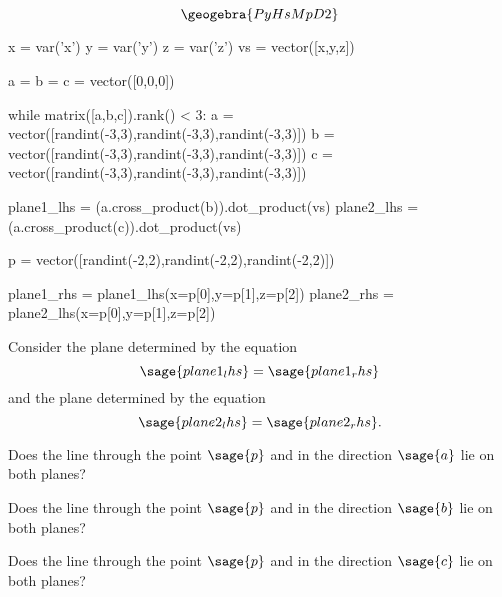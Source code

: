 \documentclass{ximera}
\author{Jim Fowler}
\begin{document}
\[
\geogebra{PyHsMpD2}
\]

\makerandom
\begin{sagesilent}
  x = var('x')
  y = var('y')
  z = var('z')
  vs = vector([x,y,z])
  
  a = b = c = vector([0,0,0])

  while matrix([a,b,c]).rank() < 3:
    a = vector([randint(-3,3),randint(-3,3),randint(-3,3)])
    b = vector([randint(-3,3),randint(-3,3),randint(-3,3)])
    c = vector([randint(-3,3),randint(-3,3),randint(-3,3)])

  plane1_lhs = (a.cross_product(b)).dot_product(vs)
  plane2_lhs = (a.cross_product(c)).dot_product(vs)

  p = vector([randint(-2,2),randint(-2,2),randint(-2,2)])

  plane1_rhs = plane1_lhs(x=p[0],y=p[1],z=p[2])
  plane2_rhs = plane2_lhs(x=p[0],y=p[1],z=p[2])
\end{sagesilent}

\begin{exercise}
  Consider the plane determined by the equation
  \[
    \sage{plane1_lhs} = \sage{plane1_rhs}
  \]
  and the plane determined by the equation
  \[
    \sage{plane2_lhs} = \sage{plane2_rhs}.
  \]

  \begin{question}
    Does the line through the point $\sage{p}$ and in the direction
    $\sage{a}$ lie on both planes?
    \begin{multipleChoice}
    \end{multipleChoice}
  \end{question}

  \begin{question}
    Does the line through the point $\sage{p}$ and in the direction
    $\sage{b}$ lie on both planes?
    \begin{multipleChoice}
    \end{multipleChoice}
  \end{question}
  
  \begin{question}
    Does the line through the point $\sage{p}$ and in the direction
    $\sage{c}$ lie on both planes?
    \begin{multipleChoice}
    \end{multipleChoice}    
  \end{question}
  
\end{exercise}
\end{document}
